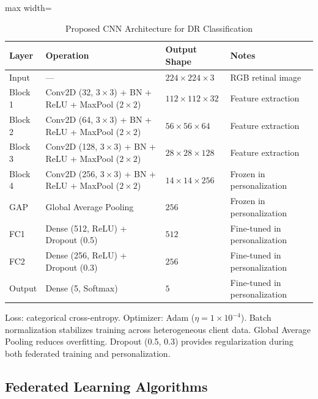 \documentclass[12pt, a4paper]{article}
\begin{document}
\begin{table}[H]
\centering
\caption{Proposed CNN Architecture for DR Classification}
\label{tab:cnnarch}
\begin{adjustbox}{max width=\textwidth}
\begin{tabular}{llp{2.8cm}p{3.2cm}}
\toprule
\textbf{Layer} & \textbf{Operation} & \textbf{Output Shape} & \textbf{Notes} \\
\midrule
Input   & ---                                                   & $224\times224\times3$  & RGB retinal image \\
Block 1 & Conv2D (32, $3\times3$) + BN + ReLU + MaxPool ($2\times2$) & $112\times112\times32$ & Feature extraction \\
Block 2 & Conv2D (64, $3\times3$) + BN + ReLU + MaxPool ($2\times2$) & $56\times56\times64$   & Feature extraction \\
Block 3 & Conv2D (128, $3\times3$) + BN + ReLU + MaxPool ($2\times2$) & $28\times28\times128$  & Feature extraction \\
Block 4 & Conv2D (256, $3\times3$) + BN + ReLU + MaxPool ($2\times2$) & $14\times14\times256$  & Frozen in personalization \\
GAP     & Global Average Pooling                                & $256$                  & Frozen in personalization \\
FC1     & Dense (512, ReLU) + Dropout (0.5)                    & $512$                  & Fine-tuned in personalization \\
FC2     & Dense (256, ReLU) + Dropout (0.3)                    & $256$                  & Fine-tuned in personalization \\
Output  & Dense (5, Softmax)                                    & $5$                    & Fine-tuned in personalization \\
\bottomrule
\end{tabular}
\end{adjustbox}
\end{table}

\noindent
Loss: categorical cross-entropy. Optimizer: Adam ($\eta = 1\times10^{-4}$). Batch normalization stabilizes training across heterogeneous client data. Global Average Pooling reduces overfitting. Dropout (0.5, 0.3) provides regulari\-zation during both federated training and personalization.

\subsection{Federated Learning Algorithms}
\end{document}
